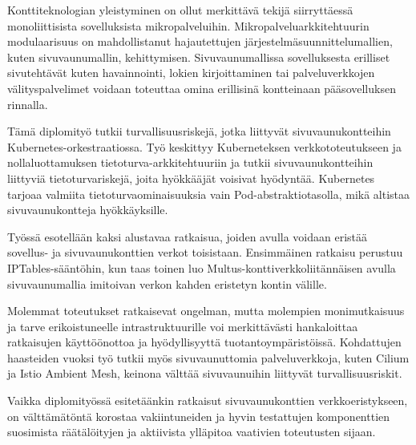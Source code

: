 \documentclass[english, 12pt, a4paper, sci, utf8, a-2b, online]{aaltothesis}
\begin{document}
\newpage
\date{29.12.2023}


\begin{abstractpage}[finnish]
  Konttiteknologian yleistyminen on ollut merkittävä tekijä siirryttäessä monoliittisista sovelluksista mikropalveluihin.
  Mikropalveluarkkitehtuurin modulaarisuus on mahdollistanut hajautettujen järjestelmäsuunnittelumallien, kuten sivuvaunumallin, kehittymisen.
  Sivuvaunumallissa sovelluksesta erilliset sivutehtävät kuten havainnointi, lokien kirjoittaminen tai palveluverkkojen välityspalvelimet voidaan toteuttaa omina erillisinä kontteinaan pääsovelluksen rinnalla.

  Tämä diplomityö tutkii turvallisuusriskejä, jotka liittyvät sivuvaunukontteihin Kubernetes-orkestraatiossa.
  Työ keskittyy Kuberneteksen verkkototeutukseen ja nollaluottamuksen tietoturva-arkkitehtuuriin ja tutkii sivuvaunukontteihin liittyviä tietoturvariskejä, joita hyökkääjät voisivat hyödyntää.
  Kubernetes tarjoaa valmiita tietoturvaominaisuuksia vain Pod-abstraktiotasolla, mikä altistaa sivuvaunukontteja hyökkäyksille.

  Työssä esotellään kaksi alustavaa ratkaisua, joiden avulla voidaan eristää sovellus- ja sivuvaunukonttien verkot toisistaan.
  Ensimmäinen ratkaisu perustuu IPTables-sääntöhin, kun taas toinen luo Multus-konttiverkkoliitännäisen avulla sivuvaunumallia imitoivan verkon kahden eristetyn kontin välille.

  Molemmat toteutukset ratkaisevat ongelman, mutta molempien monimutkaisuus ja tarve erikoistuneelle intrastruktuurille voi merkittävästi hankaloittaa ratkaisujen käyttöönottoa ja hyödyllisyyttä tuotantoympäristöissä.
  Kohdattujen haasteiden vuoksi työ tutkii myös sivuvaunuttomia palveluverkkoja, kuten Cilium ja Istio Ambient Mesh, keinona välttää sivuvaunuihin liittyvät turvallisuusriskit.

  Vaikka diplomityössä esitetäänkin ratkaisut sivuvaunukonttien verkkoeristykseen, on välttämätöntä korostaa vakiintuneiden ja hyvin testattujen komponenttien suosimista räätälöityjen ja aktiivista ylläpitoa vaativien toteutusten sijaan.
\end{abstractpage}
\end{document}

